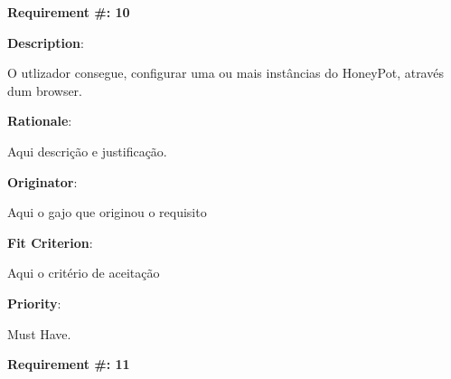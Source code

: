 \pagebreak






\begin{minipage}{0.55\textwidth}
\begin{flushleft}\textbf{Requirement \#: 10}\end{flushleft}
\end{minipage}
\begin{minipage}{0.4\textwidth}
\end{minipage}

\begin{description}
\item \textbf{Description}:

O utlizador consegue, configurar uma ou mais instâncias do HoneyPot, através dum browser.

\item \textbf{Rationale}:

Aqui descrição e justificação. \\
\item \textbf{Originator}:

Aqui o gajo que originou o requisito\\

\item \textbf{Fit Criterion}:

Aqui o critério de aceitação \\

\item \textbf{Priority}:

Must Have. \\

\end{description}

\pagebreak






\begin{minipage}{0.55\textwidth}
\begin{flushleft}\textbf{Requirement \#: 11}\end{flushleft}
\end{minipage}
\begin{minipage}{0.4\textwidth}
\end{minipage}


